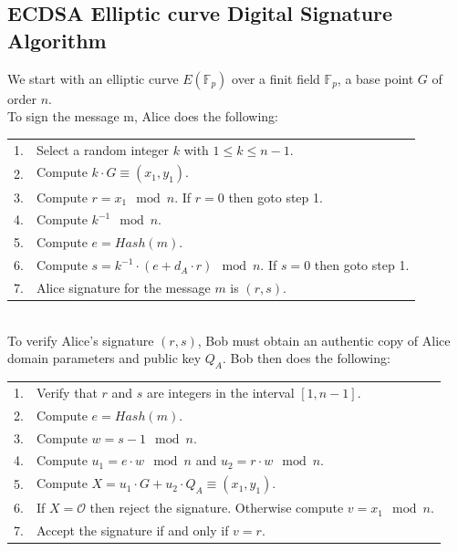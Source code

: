 \subsection{ECDSA Elliptic curve Digital Signature Algorithm}
We start with an elliptic curve $E(\mathbb{F}_p)$ over a finit field $\mathbb{F}_p$, a base point $G$ of order $n$.\\
To sign the message m, Alice does the following:\\
\begin{tabular}{l l}
	1. 	&	Select a random integer $k$ with $1 \leq k \leq n-1$. \\
	2. 	&	Compute $k \cdot G \equiv (x_1, y_1)$. \\
	3. 	&	Compute $r = x_1 \mod n$. If $r = 0$ then goto step 1.\\
	4. 	&	Compute $k^{-1} \mod n$.\\
	5. 	&	Compute $e = Hash(m)$.\\
	6. 	&	Compute $s=k^{-1} \cdot (e+d_A \cdot r) \mod n$. If $s = 0$ then goto step 1.\\
	7. 	&	Alice signature for the message $m$ is $(r, s)$.\\
\end{tabular}\\

To verify Alice's signature $(r, s)$, Bob must obtain an authentic copy of Alice domain parameters
and public key $Q_A$. Bob then does the following:\\
\begin{tabular}{l l}
	1. 	&	Verify that $r$ and $s$ are integers in the interval $[1, n-1]$.\\
	2. 	&	Compute $e = Hash(m)$.\\
	3. 	&	Compute $w = s-1 \mod n$.\\
	4. 	&	Compute $u_1 = e \cdot w \mod n$ and $u_2 = r \cdot w \mod n$.\\
	5. 	&	Compute $X = u_1 \cdot G + u_2 \cdot Q_A \equiv (x_1, y_1)$.\\
	6. 	&	If $X = \mathcal{O}$ then reject the signature. Otherwise compute $v = x_1 \mod n$.\\
	7. 	&	Accept the signature if and only if $v = r$.\\
\end{tabular}
